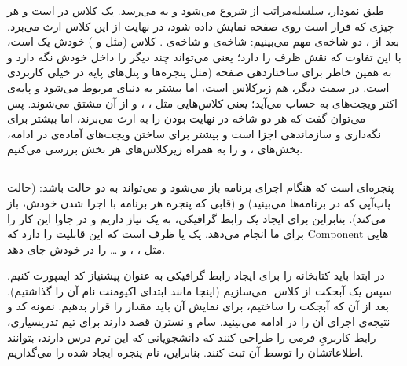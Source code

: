 طبق نمودار، سلسله‌مراتب از شروع می‌شود و به
 می‌رسد.  یک کلاس در
 است و هر چیزی که قرار است روی صفحه نمایش داده شود، در
نهایت از این کلاس ارث می‌برد. بعد از ، دو شاخه‌ی
مهم می‌بینیم: شاخه‌ی  و شاخه‌ی
. کلاس  (مثل
 و ) خودش یک
 است، با این تفاوت که نقش ظرف را دارد؛ یعنی
می‌تواند چند  دیگر را داخل خودش نگه دارد و به همین
خاطر برای ساختاردهی صفحه (مثل پنجره‌ها و پنل‌های پایه در  خیلی
کاربردی است. در سمت دیگر،  هم زیرکلاس
 است، اما بیشتر به دنیای 
مربوط می‌شود و پایه‌ی اکثر ویجت‌های  به حساب می‌آید؛ یعنی کلاس‌هایی
مثل ، ،  و
 از آن مشتق می‌شوند. پس می‌توان گفت که هر دو شاخه در
نهایت  بودن را به ارث می‌برند، اما 
بیشتر برای نگه‌داری و سازماندهی اجزا است و  بیشتر
برای ساختن ویجت‌های آماده‌ی  در ادامه، بخش‌‌های
 ، و  را
به همراه زیرکلاس‌های هر بخش بررسی می‌کنیم.

\subsection{}

پنجره‌ای است که هنگام اجرای برنامه باز می‌شود و می‌تواند به دو حالت باشد:
 (حالت پاپ‌آپی که در برنامه‌ها می‌بینید) و
 (قابی که پنجره هر برنامه با اجرا شدن خودش، باز
می‌کند). بنابراین برای ایجاد یک رابط گرافیکی، به یک 
نیاز داریم و  در جاوا این کار را برای ما انجام
می‌دهد.  یک  یا ظرف است که این قابلیت
را دارد که Component‌ هایی مثل  ،
 ،  و \ldots{} را در خودش جای
دهد.

در ابتدا باید کتابخانه  را برای ایجاد رابط گرافیکی به
عنوان پیشنیاز کد ایمپورت کنیم. سپس یک آبجکت از کلاس ‍‍
می‌‌سازیم (اینجا مانند ابتدای اکیومنت نام آن را 
گذاشتیم). بعد از آن که آبجکت را ساختیم، برای نمایش آن باید مقدار
 را  قرار بدهیم. نمونه کد و
نتیجه‌ی اجرای آن را در ادامه می‌بینید. سام و نسترن قصد دارند برای تیم
تدریسیاری، رابط کاربریِ فرمی را طراحی کنند که دانشجویانی که این ترم درس
 دارند، بتوانند اطلاعاتشان را توسط آن ثبت کنند. بنابراین، نام
پنجره ایجاد شده را  می‌گذاریم.

